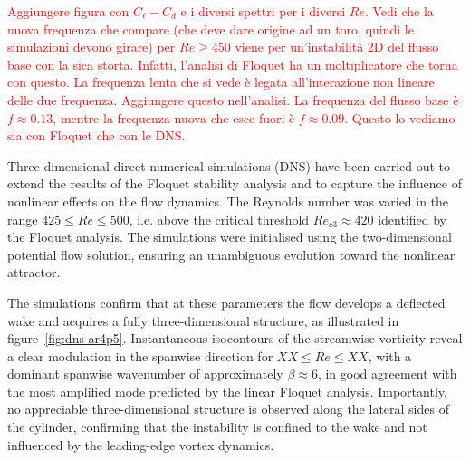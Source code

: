 \textcolor{red}{Aggiungere figura con $C_\ell-C_d$ e i diversi spettri per i diversi $Re$. Vedi che la nuova frequenza che compare (che deve dare origine ad un toro, quindi le simulazioni devono girare) per $Re \ge 450$ viene per un'instabilità 2D del flusso base con la sica storta. Infatti, l'analisi di Floquet ha un moltiplicatore che torna con questo. La frequenza lenta che si vede è legata all'interazione non lineare delle due frequenza. Aggiungere questo nell'analisi. La frequenza del flusso base è $f \approx 0.13$, mentre la frequenza nuova che esce fuori è $f \approx 0.09$. Questo lo vediamo sia con Floquet che con le DNS.}



Three-dimensional direct numerical simulations (DNS) have been carried out to extend the results of the Floquet stability analysis and to capture the influence of nonlinear effects on the flow dynamics. The Reynolds number was varied in the range $425 \le Re \le 500$, i.e. above the critical threshold $Re_{c3} \approx 420$ identified by the Floquet analysis. The simulations were initialised using the two-dimensional potential flow solution, ensuring an unambiguous evolution toward the nonlinear attractor.

The simulations confirm that at these parameters the flow develops a deflected wake and acquires a fully three-dimensional structure, as illustrated in figure~\ref{fig:dns-ar4p5}. Instantaneous isocontours of the streamwise vorticity reveal a clear modulation in the spanwise direction for $ XX \le Re \le XX $, with a dominant spanwise wavenumber of approximately $\beta \approx 6$, in good agreement with the most amplified mode predicted by the linear Floquet analysis. Importantly, no appreciable three-dimensional structure is observed along the lateral sides of the cylinder, confirming that the instability is confined to the wake and not influenced by the leading-edge vortex dynamics.

